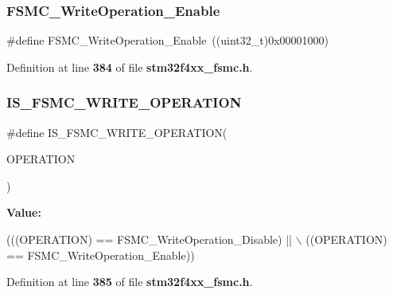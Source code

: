 \subsubsection{F\+S\+M\+C\+\_\+\+Write\+Operation\+\_\+\+Enable}
{\footnotesize\ttfamily \#define F\+S\+M\+C\+\_\+\+Write\+Operation\+\_\+\+Enable~((uint32\+\_\+t)0x00001000)}



Definition at line \textbf{ 384} of file \textbf{ stm32f4xx\+\_\+fsmc.\+h}.

\mbox{\label{group__FSMC__Write__Operation_ga87fc20d11761caa66c3e7d77a3a7d3e3}} 
\subsubsection{I\+S\+\_\+\+F\+S\+M\+C\+\_\+\+W\+R\+I\+T\+E\+\_\+\+O\+P\+E\+R\+A\+T\+I\+ON}
{\footnotesize\ttfamily \#define I\+S\+\_\+\+F\+S\+M\+C\+\_\+\+W\+R\+I\+T\+E\+\_\+\+O\+P\+E\+R\+A\+T\+I\+ON(\begin{DoxyParamCaption}\item[{}]{O\+P\+E\+R\+A\+T\+I\+ON }\end{DoxyParamCaption})}

{\bfseries Value\+:}
\begin{DoxyCode}
(((OPERATION) == FSMC_WriteOperation_Disable) || \(\backslash\)
                                            ((OPERATION) == 
      FSMC_WriteOperation_Enable))
\end{DoxyCode}


Definition at line \textbf{ 385} of file \textbf{ stm32f4xx\+\_\+fsmc.\+h}.

